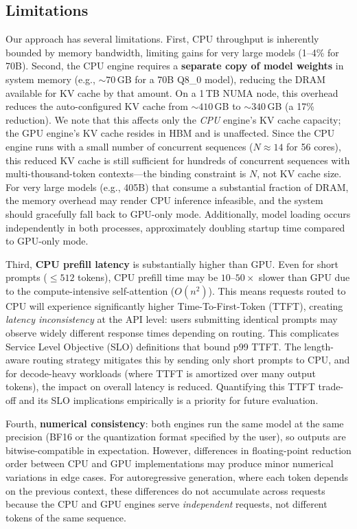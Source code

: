 \documentclass[10pt,conference]{IEEEtran}
\begin{document}
\subsection{Limitations}

Our approach has several limitations.
First, CPU throughput is inherently bounded by memory bandwidth, limiting gains for very large models (1--4\% for 70B).
Second, the CPU engine requires a \textbf{separate copy of model weights} in system memory (e.g., ${\sim}70$\,GB for a 70B Q8\_0 model), reducing the DRAM available for KV cache by that amount.
On a 1\,TB NUMA node, this overhead reduces the auto-configured KV cache from ${\sim}410$\,GB to ${\sim}340$\,GB (a 17\% reduction).
We note that this affects only the \emph{CPU} engine's KV cache capacity; the GPU engine's KV cache resides in HBM and is unaffected.
Since the CPU engine runs with a small number of concurrent sequences ($N \approx 14$ for 56 cores), this reduced KV cache is still sufficient for hundreds of concurrent sequences with multi-thousand-token contexts---the binding constraint is $N$, not KV cache size.
For very large models (e.g., 405B) that consume a substantial fraction of DRAM, the memory overhead may render CPU inference infeasible, and the system should gracefully fall back to GPU-only mode.
Additionally, model loading occurs independently in both processes, approximately doubling startup time compared to GPU-only mode.

Third, \textbf{CPU prefill latency} is substantially higher than GPU.
Even for short prompts (${\leq}512$ tokens), CPU prefill time may be $10\text{--}50{\times}$ slower than GPU due to the compute-intensive self-attention ($O(n^2)$).
This means requests routed to CPU will experience significantly higher Time-To-First-Token (TTFT), creating \emph{latency inconsistency} at the API level: users submitting identical prompts may observe widely different response times depending on routing.
This complicates Service Level Objective (SLO) definitions that bound p99 TTFT.
The length-aware routing strategy mitigates this by sending only short prompts to CPU, and for decode-heavy workloads (where TTFT is amortized over many output tokens), the impact on overall latency is reduced.
Quantifying this TTFT trade-off and its SLO implications empirically is a priority for future evaluation.

Fourth, \textbf{numerical consistency}: both engines run the same model at the same precision (BF16 or the quantization format specified by the user), so outputs are bitwise-compatible in expectation.
However, differences in floating-point reduction order between CPU and GPU implementations may produce minor numerical variations in edge cases.
For autoregressive generation, where each token depends on the previous context, these differences do not accumulate across requests because the CPU and GPU engines serve \emph{independent} requests, not different tokens of the same sequence.
\end{document}
